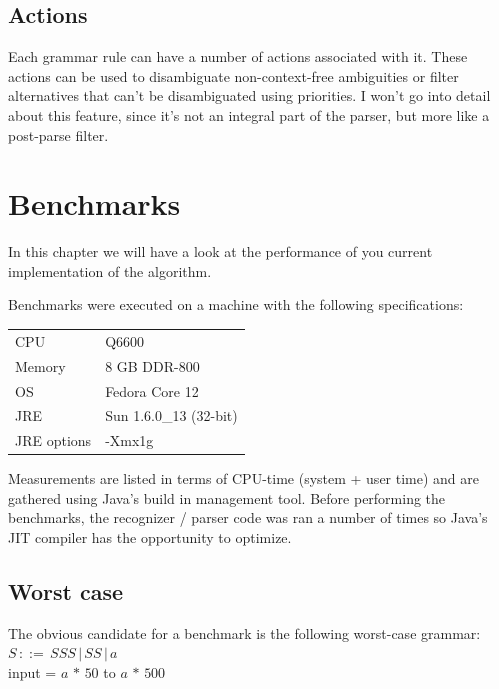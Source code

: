 \documentclass[a4paper,10pt]{article}
\begin{document}
\subsection{Actions}

Each grammar rule can have a number of actions associated with it. These actions can be used to disambiguate non-context-free ambiguities or filter alternatives that can't be disambiguated using priorities. I won't go into detail about this feature, since it's not an integral part of the parser, but more like a post-parse filter.

\section{Benchmarks}

In this chapter we will have a look at the performance of you current implementation of the algorithm.

Benchmarks were executed on a machine with the following specifications:
\begin{table}[H]
\centering
\begin{tabular}{ | p{6em} | p{9em} | }
 \hline
 CPU & Q6600 \\
 Memory & 8 GB DDR-800 \\
 OS & Fedora Core 12 \\
 JRE & Sun 1.6.0\_13 (32-bit) \\
 JRE options & -Xmx1g \\
 \hline
\end{tabular}
\end{table}

Measurements are listed in terms of CPU-time (system + user time) and are gathered using Java's build in management tool. Before performing the benchmarks, the recognizer / parser code was ran a number of times so Java's JIT compiler has the opportunity to optimize.

\subsection{Worst case}

The obvious candidate for a benchmark is the following worst-case grammar:
$S\,::=\,SSS\,|\,SS\,|\,a$\\
input = $a\,*\,50$ to $a\,*\,500$
\end{document}
